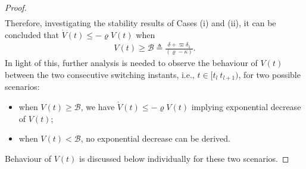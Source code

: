 \begin{proof}
\begin{align}
	\end{align}
	Therefore, investigating the stability results of Cases (i) and (ii), it can be concluded that $\dot{V}(t) \leq - \varrho V(t) $ when
	\begin{align}
	V(t) \geq \mathcal{B} \triangleq \frac{\delta + \varpi \delta_1}{(\varrho - \kappa)}.
	\end{align}
	In light of this, further analysis is needed to observe the behaviour of $V(t)$ between the two consecutive switching instants, i.e., $t \in [t_{l}~t_{l+1})$, for two possible scenarios: 
	\begin{itemize}
		\item[\textbf{(i)}] when $V(t) \geq \mathcal{B}$, we have $\dot{V}(t) \leq - \varrho V(t) $ implying exponential decrease of $V(t)$;
		\item[\textbf{(ii)}] when $V(t) <\mathcal{B}$, no exponential decrease can be derived.
	\end{itemize}
	Behaviour of $V(t)$ is discussed below individually for these two scenarios.
	

\end{proof}
